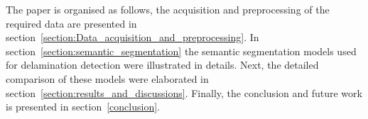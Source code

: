 The paper is organised as follows, the acquisition and preprocessing of the required data are presented in section~\ref{section:Data_acquisition_and_preprocessing}.
In section~\ref{section:semantic_segmentation} the semantic segmentation models used for delamination detection were illustrated in details. 
Next, the detailed comparison of these models were elaborated in section~\ref{section:results_and_discussions}.
Finally, the conclusion and future work is presented in section~\ref{conclusion}.